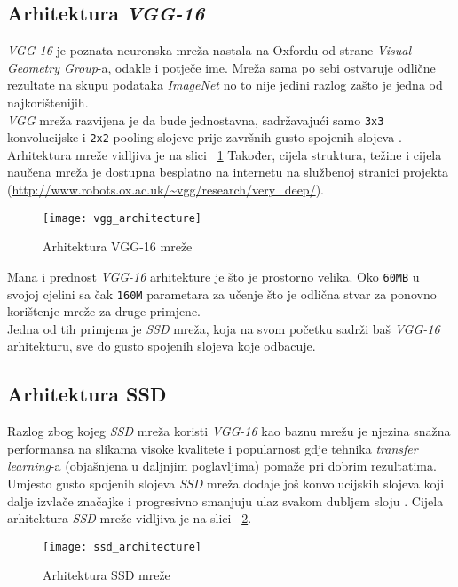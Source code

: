 \subsection{Arhitektura \emph{VGG-16}}
\emph{VGG-16} je poznata neuronska mreža nastala na Oxfordu od strane \emph{Visual Geometry Group}-a, odakle i potječe ime.
Mreža sama po sebi ostvaruje odlične rezultate na skupu podataka \emph{ImageNet} no to nije jedini razlog zašto je jedna od najkorištenijih. \\
\emph{VGG} mreža razvijena je da bude jednostavna, sadržavajući samo \texttt{3x3} konvolucijske i \texttt{2x2} pooling slojeve prije završnih gusto spojenih slojeva \cite{simonyan2014very}.
Arhitektura mreže vidljiva je na slici ~\ref{fig:VGGArchitecture}
Također, cijela struktura, težine i cijela naučena mreža je dostupna besplatno na internetu na službenoj stranici projekta (\url{http://www.robots.ox.ac.uk/~vgg/research/very_deep/}).
\begin{figure}[h!]
	\centering
	\texttt{[image: vgg\_architecture]}
	 \caption{Arhitektura VGG-16 mreže}
 	 \label{fig:VGGArchitecture}
\end{figure}
Mana i prednost \emph{VGG-16} arhitekture je što je prostorno velika.
Oko \texttt{60MB} u svojoj cjelini sa čak \texttt{160M} parametara za učenje što je odlična stvar za ponovno korištenje mreže za druge primjene. \\
Jedna od tih primjena je \emph{SSD} mreža, koja na svom početku sadrži baš \emph{VGG-16} arhitekturu, sve do gusto spojenih slojeva koje odbacuje.

\subsection{Arhitektura SSD}
Razlog zbog kojeg \emph{SSD} mreža koristi \emph{VGG-16} kao baznu mrežu je njezina snažna performansa na slikama visoke kvalitete i popularnost gdje tehnika \emph{transfer learning}-a (objašnjena u daljnjim poglavljima) pomaže pri dobrim rezultatima.
Umjesto gusto spojenih slojeva \emph{SSD} mreža dodaje još konvolucijskih slojeva koji dalje izvlače značajke i progresivno smanjuju ulaz svakom dubljem sloju \cite{liu2016ssd}.
Cijela arhitektura \emph{SSD} mreže vidljiva je na slici ~\ref{fig:SSDArchitecture}.
\begin{figure}[h!]
	\centering
	\texttt{[image: ssd\_architecture]}
	 \caption{Arhitektura SSD mreže}
 	 \label{fig:SSDArchitecture}
\end{figure}
